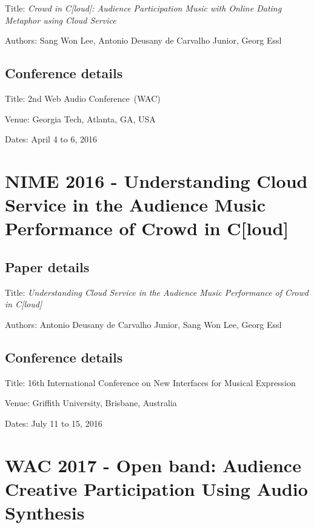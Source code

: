 Title: \textit{Crowd in C[loud]: Audience Participation Music with Online Dating Metaphor using Cloud Service}

Authors: Sang Won Lee, Antonio Deusany de Carvalho Junior, Georg Essl

\subsection*{Conference details}

Title: 2nd Web Audio Conference~(WAC)

Venue: Georgia Tech, Atlanta, GA, USA

Dates: April 4 to 6, 2016



\section{NIME 2016 - Understanding Cloud Service in the Audience Music Performance of Crowd in C[loud]}
\label{ape:papernime2016}

\subsection*{Paper details}

Title: \textit{Understanding Cloud Service in the Audience Music Performance of Crowd in C[loud]}

Authors: Antonio Deusany de Carvalho Junior, Sang Won Lee, Georg Essl

\subsection*{Conference details}

Title: 16th International Conference on New Interfaces for Musical Expression

Venue: Griffith University, Brisbane, Australia

Dates: July 11 to 15, 2016



\section{WAC 2017 - Open band: Audience Creative Participation Using Audio Synthesis}
\label{ape:paperwac2017}


